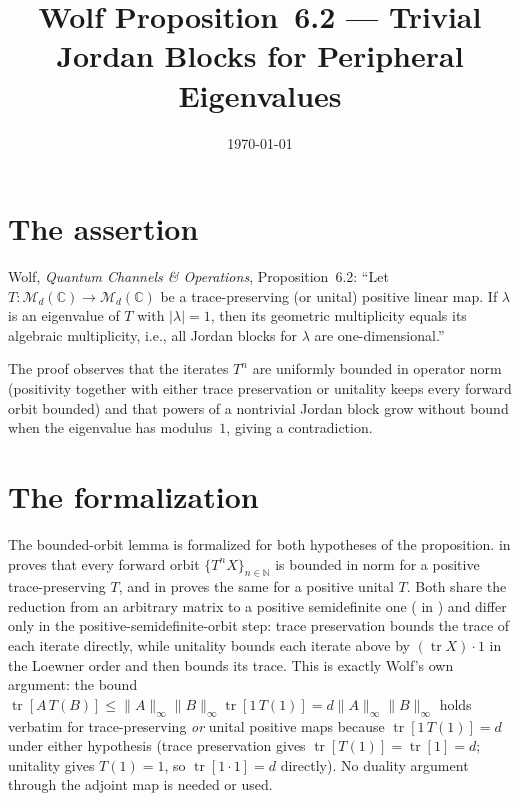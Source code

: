 \documentclass{article}
\title{Wolf Proposition~6.2 --- Trivial Jordan Blocks for Peripheral Eigenvalues}
\author{}
\date{\today}
\begin{document}
\maketitle
{}

\section{The assertion}

Wolf, \emph{Quantum Channels \& Operations}, Proposition~6.2:
``Let $T:\mathcal M_d(\mathbb C)\to\mathcal M_d(\mathbb C)$ be a
trace-preserving (or unital) positive linear map.  If $\lambda$ is an
eigenvalue of $T$ with $|\lambda|=1$, then its geometric multiplicity
equals its algebraic multiplicity, i.e., all Jordan blocks for $\lambda$
are one-dimensional.''

The proof observes that the iterates $T^n$ are uniformly bounded in
operator norm (positivity together with either trace preservation or
unitality keeps every forward orbit bounded) and that powers of a
nontrivial Jordan block grow without bound when the eigenvalue has
modulus~$1$, giving a contradiction.

\section{The formalization}

The bounded-orbit lemma is formalized for both hypotheses of the
proposition.  in
 proves
that every forward orbit $\{T^n X\}_{n\in\mathbb N}$ is bounded in norm
for a positive trace-preserving $T$, and
 in
 proves the same for a
positive unital $T$. Both share the reduction from an arbitrary matrix to
a positive semidefinite one
( in
) and differ only
in the positive-semidefinite-orbit step: trace preservation bounds the trace
of each iterate directly, while unitality bounds each iterate above by
$(\operatorname{tr}X)\cdot 1$ in the Loewner order and then bounds its trace.
This is exactly Wolf's own argument: the bound
$\operatorname{tr}[A\,T(B)] \le \|A\|_\infty \|B\|_\infty
\operatorname{tr}[1\,T(1)] = d\|A\|_\infty\|B\|_\infty$ holds verbatim for
trace-preserving \emph{or} unital positive maps because
$\operatorname{tr}[1\,T(1)] = d$ under either hypothesis (trace preservation
gives $\operatorname{tr}[T(1)] = \operatorname{tr}[1] = d$; unitality gives
$T(1) = 1$, so $\operatorname{tr}[1\cdot 1] = d$ directly). No duality
argument through the adjoint map is needed or used.
\end{document}
